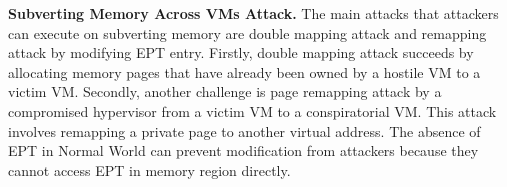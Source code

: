 ﻿\documentclass[conference]{IEEEtran}
\begin{document}




\textbf{Subverting Memory Across VMs Attack.}
%
The main attacks that attackers can execute on subverting memory are double mapping attack and remapping attack by modifying EPT entry.
Firstly, double mapping attack succeeds by allocating memory pages that have already been owned by a hostile VM to a victim VM. Secondly, another challenge is page remapping attack by a compromised hypervisor from a victim VM to a conspiratorial VM. This attack involves remapping a private page to another virtual address.
The absence of EPT in Normal World can prevent modification from attackers because they cannot access EPT in memory region directly.

\end{document}
